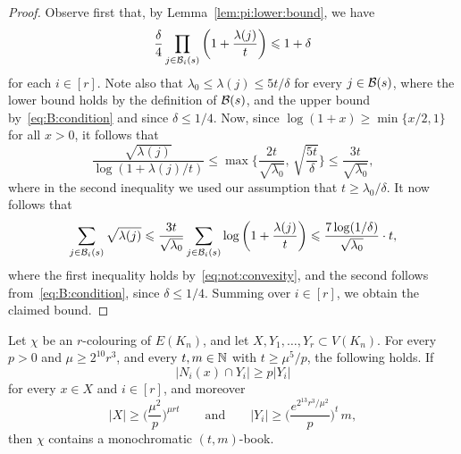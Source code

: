 \begin{proof}
  Observe first that, by Lemma~\ref{lem:pi:lower:bound}, we have 
  \begin{equation}\label{eq:B:condition}
  \frac{\delta}{4} \prod_{j \in \mathcal{B}_i(s)} \bigg( 1 + \frac{\lambda(j)}{t} \bigg) \leqslant 1 + \delta
  \end{equation}
  for each $i \in [r]$. Note also that $\lambda_0 \le \lambda(j) \le 5t/\delta$ for every $j \in \mathcal{B}(s)$, where the lower bound holds by the definition of $\mathcal{B}(s)$, and the upper bound by~\eqref{eq:B:condition} and since $\delta \le 1/4$. Now, since $\log(1+x) \ge \min\{ x/2,1\}$ for all $x > 0$, it follows that
  \begin{equation}\label{eq:not:convexity}
  \frac{ \sqrt{\lambda(j)} }{\log(1 + \lambda(j)/t) } \le \max\bigg\{ \frac{ 2t }{ \sqrt{\lambda_0} }, \, \sqrt{ \frac{5t}{\delta}} \bigg\} \le \frac{ 3t }{ \sqrt{\lambda_0} },
  \end{equation}
  where in the second inequality we used %
  our assumption that $t \ge \lambda_0 / \delta$. It now follows that
  $$\sum_{j \in \mathcal{B}_i(s)} \sqrt{\lambda(j)} \leqslant \frac{ 3t }{ \sqrt{\lambda_0} } \sum_{j \in \mathcal{B}_i(s)} \log \bigg( 1 + \frac{\lambda(j)}{t} \bigg) \leqslant \frac{7 \log(1/\delta)}{\sqrt{\lambda_0}} \cdot t,$$
  where the first inequality holds by~\eqref{eq:not:convexity}, and the second follows from~\eqref{eq:B:condition}, since $\delta \le 1/4$. Summing over $i \in [r]$, we obtain the claimed bound. 
\end{proof}


\begin{theorem}\label{thm:book}
  Let\/ $\chi$ be an\/ $r$-colouring of\/ $E(K_n)$, and let\/ $X,Y_1,\ldots,Y_r \subset V(K_n)$. %
  For every $p > 0$ and $\mu \ge 2^{10} r^3$, and every $t,m \in \mathbb{N}$ with $t \ge \mu^5 / p$, the following holds. If 
  $$|N_i(x) \cap Y_i| \ge p|Y_i|$$
  for every $x \in X$ and $i \in [r]$, and moreover
  $$|X| \ge \bigg( \frac{\mu^2}{p} \bigg)^{\mu r t} \qquad \text{and} \qquad |Y_i| \ge \bigg( \frac{e^{2^{13} r^3 / \mu^2}}{p} \bigg)^t \, m,$$ 
  then $\chi$ contains a monochromatic $(t,m)$-book.
\end{theorem}

